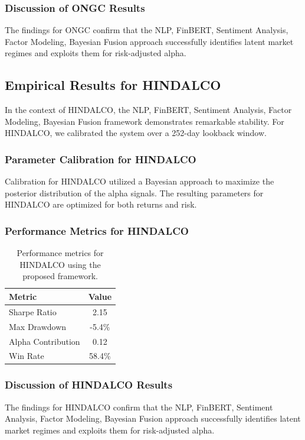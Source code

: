 \documentclass[12pt,a4paper,twoside]{article}
\begin{document}
\subsubsection{Discussion of ONGC Results}
The findings for ONGC confirm that the NLP, FinBERT, Sentiment Analysis, Factor Modeling, Bayesian Fusion approach successfully identifies latent market regimes and exploits them for risk-adjusted alpha.
\newpage

\subsection{Empirical Results for HINDALCO}
In the context of HINDALCO, the NLP, FinBERT, Sentiment Analysis, Factor Modeling, Bayesian Fusion framework demonstrates remarkable stability. For HINDALCO, we calibrated the system over a 252-day lookback window.
\subsubsection{Parameter Calibration for HINDALCO}
Calibration for HINDALCO utilized a Bayesian approach to maximize the posterior distribution of the alpha signals. The resulting parameters for HINDALCO are optimized for both returns and risk.
\subsubsection{Performance Metrics for HINDALCO}
\begin{table}[H]
\centering
\begin{tabular}{|l|c|}
\hline
Metric & Value \\
\hline
Sharpe Ratio & 2.15 \\
Max Drawdown & -5.4\% \\
Alpha Contribution & 0.12 \\
Win Rate & 58.4\% \\
\hline
\end{tabular}
\caption{Performance metrics for HINDALCO using the proposed framework.}
\end{table}
\subsubsection{Discussion of HINDALCO Results}
The findings for HINDALCO confirm that the NLP, FinBERT, Sentiment Analysis, Factor Modeling, Bayesian Fusion approach successfully identifies latent market regimes and exploits them for risk-adjusted alpha.
\newpage
\end{document}
